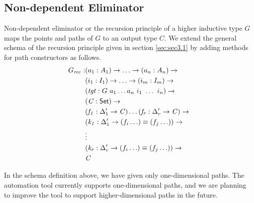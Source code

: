 \documentclass[sigplan,10pt]{acmart}
\begin{document}
\subsection{Non-dependent Eliminator}
\label{sec:sec4.2}

Non-dependent eliminator or the recursion principle of a higher inductive type $G$ maps the points and paths of $G$ to an output type $C$. We extend the general schema of the recursion principle given in section \ref{sec:sec3.1} by adding methods for path constructors as follows.
\begin{align*}
G_{\mathit{rec}} : & (a_1 : A_1) \to \ldots \to (a_n : A_n) \to\\
& (i_1 : I_1) \to \ldots \to (i_m : I_m) \to\\
& (\mathit{tgt} : G\ a_1 \ldots a_n\ i_1\ \ldots\ i_n) \to\\
& (\mathit{C} : \textsf{Set}{}) \to \\
& (\mathit{f_1} : \Delta_1^\prime \to \mathit{C}) \ldots (\mathit{f_r} : \Delta_r^\prime \to \mathit{C}) \to \\
& (\mathit{k_1} : \Delta_1^\prime \to (f_i \ldots) \equiv (f_j \ldots)) \to \\
& \vdots \\
& (\mathit{k_r} : \Delta_r^\prime \to (f_i \ldots) \equiv (f_j \ldots)) \to \\
& \mathit{C}
\end{align*}
 
In the schema definition above, we have given only one-dimensional paths. The automation tool currently supports one-dimensional paths, and we are planning to improve the tool to support higher-dimensional paths in the future. 
\end{document}

